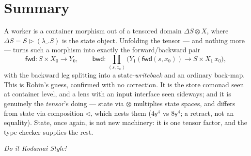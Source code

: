 \documentclass[11pt]{article}
\newcommand{\ctr}{\mathbin{\triangleright}}      %
\newcommand{\comp}{\mathbin{\triangleleft}}       %
\newcommand{\fwd}{\mathsf{fwd}}
\newcommand{\bwd}{\mathsf{bwd}}
\newcommand{\y}{\mathsf{y}}
\theoremstyle{plain}
\theoremstyle{definition}
\begin{document}
\section*{Summary}

A worker is a container morphism out of a tensored domain $\Delta S\otimes X$, where
$\Delta S = S\ctr(\lambda\_.S)$ is the state object. Unfolding the tensor --- and nothing more ---
turns such a morphism into exactly the forward/backward pair
\[
  \fwd : S\times X_0 \to Y_0,
  \qquad
  \bwd : \textstyle\prod_{(s,x_0)}\big(Y_1(\fwd(s,x_0))\to S\times X_1\,x_0\big),
\]
with the backward leg splitting into a state-\emph{writeback} and an ordinary back-map. This is
Robin's guess, confirmed with no correction. It is the store comonad seen at container level, and a
lens with an input interface seen sideways; and it is genuinely the \emph{tensor}'s doing --- state
via $\otimes$ multiplies state spaces, and differs from state via composition $\comp$, which nests
them ($4\y^4$ vs $8\y^4$; a retract, not an equality). State, once again, is not new machinery: it
is one tensor factor, and the type checker supplies the rest.

\begin{center}\itshape Do it Kodamai Style!\end{center}
\end{document}
